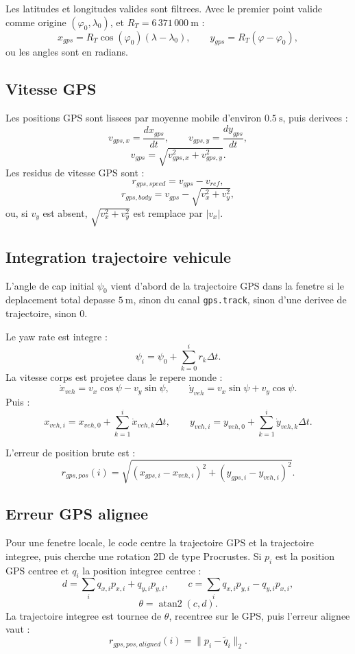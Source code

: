 \documentclass[11pt,a4paper]{article}
\begin{document}
Les latitudes et longitudes valides sont filtrees. Avec le premier point valide comme origine $(\varphi_0,\lambda_0)$, et $R_T=6\,371\,000~\mathrm{m}$ :
\[
  x_{gps}=R_T\cos(\varphi_0)(\lambda-\lambda_0),
  \qquad
  y_{gps}=R_T(\varphi-\varphi_0),
\]
ou les angles sont en radians.

\subsection{Vitesse GPS}

Les positions GPS sont lissees par moyenne mobile d'environ $0.5~\mathrm{s}$, puis derivees :
\[
  v_{gps,x}=\frac{d x_{gps}}{dt},\qquad
  v_{gps,y}=\frac{d y_{gps}}{dt},
\]
\[
  v_{gps}=\sqrt{v_{gps,x}^2+v_{gps,y}^2}.
\]
Les residus de vitesse GPS sont :
\[
  r_{gps,speed}=v_{gps}-v_{ref},
\]
\[
  r_{gps,body}=v_{gps}-\sqrt{v_x^2+v_y^2},
\]
ou, si $v_y$ est absent, $\sqrt{v_x^2+v_y^2}$ est remplace par $|v_x|$.

\subsection{Integration trajectoire vehicule}

L'angle de cap initial $\psi_0$ vient d'abord de la trajectoire GPS dans la fenetre si le deplacement total depasse $5~\mathrm{m}$, sinon du canal \texttt{gps.track}, sinon d'une derivee de trajectoire, sinon $0$.

Le yaw rate est integre :
\[
  \psi_i=\psi_0+\sum_{k=0}^{i} r_k\Delta t.
\]
La vitesse corps est projetee dans le repere monde :
\[
  \dot{x}_{veh}=v_x\cos\psi-v_y\sin\psi,
  \qquad
  \dot{y}_{veh}=v_x\sin\psi+v_y\cos\psi.
\]
Puis :
\[
  x_{veh,i}=x_{veh,0}+\sum_{k=1}^{i}\dot{x}_{veh,k}\Delta t,
  \qquad
  y_{veh,i}=y_{veh,0}+\sum_{k=1}^{i}\dot{y}_{veh,k}\Delta t.
\]

L'erreur de position brute est :
\[
  r_{gps,pos}(i)=
  \sqrt{(x_{gps,i}-x_{veh,i})^2+(y_{gps,i}-y_{veh,i})^2}.
\]

\subsection{Erreur GPS alignee}

Pour une fenetre locale, le code centre la trajectoire GPS et la trajectoire integree, puis cherche une rotation 2D de type Procrustes.
Si $p_i$ est la position GPS centree et $q_i$ la position integree centree :
\[
  d=\sum_i q_{x,i}p_{x,i}+q_{y,i}p_{y,i},
  \qquad
  c=\sum_i q_{x,i}p_{y,i}-q_{y,i}p_{x,i},
\]
\[
  \theta=\operatorname{atan2}(c,d).
\]
La trajectoire integree est tournee de $\theta$, recentree sur le GPS, puis l'erreur alignee vaut :
\[
  r_{gps,pos,aligned}(i)=\|p_i-\tilde{q}_i\|_2.
\]
\end{document}
